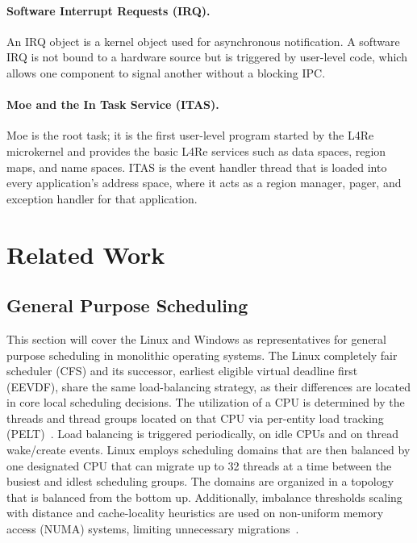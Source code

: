 \paragraph{Software Interrupt Requests (IRQ).}
An IRQ object is a kernel object used for asynchronous notification.
A software IRQ is not bound to a hardware source but is triggered by user-level code, which allows one component to signal another without a blocking IPC.

\paragraph{Moe and the In Task Service (ITAS).}
Moe is the root task; it is the first user-level program started by the L4Re microkernel and provides the basic L4Re services such as data spaces, region maps, and name spaces.
ITAS is the event handler thread that is loaded into every application's address space, where it acts as a region manager, pager, and exception handler for that application.

\section{Related Work}

\subsection{General Purpose Scheduling}

This section will cover the Linux and Windows as representatives for general purpose scheduling in monolithic operating systems.
The Linux completely fair scheduler (CFS) and its successor, earliest eligible virtual deadline first (EEVDF), share the same load-balancing strategy, as their differences are located in core local scheduling decisions.
The utilization of a CPU is determined by the threads and thread groups located on that CPU via per-entity load tracking (PELT)~\cite{linux-internals-loadbalancing}.
Load balancing is triggered periodically, on idle CPUs and on thread wake/create events.
Linux employs scheduling domains that are then balanced by one designated CPU that can migrate up to 32 threads at a time between the busiest and idlest scheduling groups.
The domains are organized in a topology that is balanced from the bottom up.
Additionally, imbalance thresholds scaling with distance and cache-locality heuristics are used on non-uniform memory access (NUMA) systems, limiting unnecessary migrations~\cite{wasted_cores, cfs_vs_ule}.

